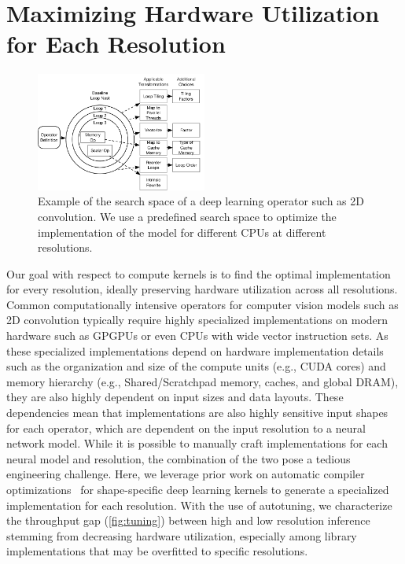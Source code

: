 \section{Maximizing Hardware Utilization for Each Resolution}
\begin{figure}[t]
    \centering
    \includegraphics[width=0.5\textwidth]{e2e_diagrams/searchspace.pdf}
    \caption{Example of the search space of a deep learning operator such as 2D convolution. We use a predefined search space to optimize the implementation of the model for different CPUs at different resolutions.}
    \label{fig:searchspace}
\end{figure}
Our goal with respect to compute kernels is to find the optimal implementation for every resolution, ideally preserving hardware utilization across all resolutions.
Common computationally intensive operators for computer vision models such as 2D convolution typically require highly specialized implementations on modern hardware such as GPGPUs or even CPUs with wide vector instruction sets.
As these specialized implementations depend on hardware implementation details such as the organization and size of the compute units (e.g., CUDA cores) and memory hierarchy (e.g., Shared/Scratchpad memory, caches, and global DRAM), they are also highly dependent on input sizes and data layouts.
These dependencies mean that implementations are also highly sensitive input shapes for each operator, which are dependent on the input resolution to a neural network model.
While it is possible to manually craft implementations for each neural model and resolution, the combination of the two pose a tedious engineering challenge.
Here, we leverage prior work on automatic compiler optimizations~\cite{chen2018learning} for shape-specific deep learning kernels to generate a specialized implementation for each resolution.
With the use of autotuning, we characterize the throughput gap (\autoref{fig:tuning}) between high and low resolution inference stemming from decreasing hardware utilization, especially among library implementations that may be overfitted to specific resolutions.

